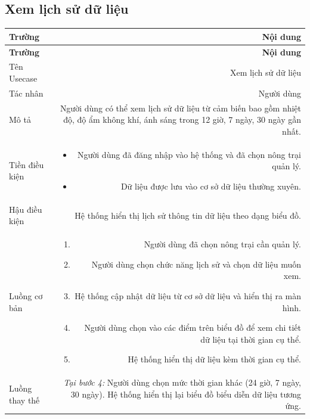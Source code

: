  
\subsection{Xem lịch sử dữ liệu}
 
\begin{longtable}{|L|R|}
 
\hline
\textbf{Trường} & \textbf{Nội dung} \\ \hline
 
\endfirsthead
 
\hline
\textbf{Trường} & \textbf{Nội dung} \\ \hline
 
\endhead
 
\endfoot
 
Tên Usecase & Xem lịch sử dữ liệu \\[4pt] \hline
 
Tác nhân & Người dùng \\[4pt] \hline
 
Mô tả & Người dùng có thể xem lịch sử dữ liệu từ cảm biến bao gồm nhiệt độ, độ ẩm không khí, ánh sáng trong 12 giờ, 7 ngày, 30 ngày gần nhất. \\[4pt] \hline
 
Tiền điều kiện &
\begin{itemize}[leftmargin=*, nosep, topsep=2pt]
  \item Người dùng đã đăng nhập vào hệ thống và đã chọn nông trại quản lý.
  \item Dữ liệu được lưu vào cơ sở dữ liệu thường xuyên.
\end{itemize} \\[4pt] \hline
 
Hậu điều kiện & Hệ thống hiển thị lịch sử thông tin dữ liệu theo dạng biểu đồ. \\[4pt] \hline
 
Luồng cơ bản &
\begin{enumerate}[leftmargin=*, nosep, topsep=2pt]
  \item Người dùng đã chọn nông trại cần quản lý.
  \item Người dùng chọn chức năng lịch sử và chọn dữ liệu muốn xem.
  \item Hệ thống cập nhật dữ liệu từ cơ sở dữ liệu và hiển thị ra màn hình.
  \item Người dùng chọn vào các điểm trên biểu đồ để xem chi tiết dữ liệu tại thời gian cụ thể.
  \item Hệ thống hiển thị dữ liệu kèm thời gian cụ thể.
\end{enumerate} \\[4pt] \hline
 
Luồng thay thế &
\textit{Tại bước 4:} Người dùng chọn mức thời gian khác (24 giờ, 7 ngày, 30 ngày).
Hệ thống hiển thị lại biểu đồ biểu diễn dữ liệu tương ứng. \\[4pt] \hline
 
\end{longtable}
 
